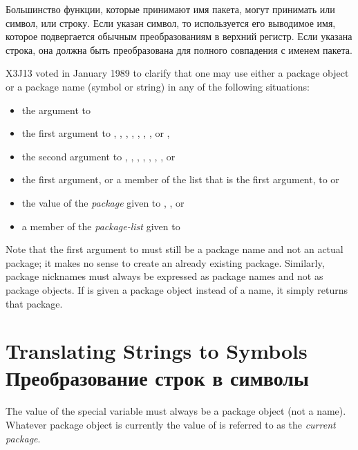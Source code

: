 Большинство функции, которые принимают имя пакета, могут принимать или символ,
или строку. Если указан символ, то используется его выводимое имя, которое
подвергается обычным преобразованиям в верхний регистр. Если указана строка, она
должна быть преобразована для полного совпадения с именем пакета.

\begin{new}
X3J13 voted in January 1989
to clarify that one may use either a package object or
a package name (symbol or string) in any of the following
situations:
\begin{itemize}
\item the  argument to 
\item the first argument to , ,
, ,
, ,
, or ,


\item the second argument to , ,
, , , , ,
or 
\item the first argument, or a member of the list that is the first argument,
to  or 
\item the value of the \emph{package} given to ,
, or 
\item a member of the \emph{package-list} given to 
\end{itemize}
Note that the first argument to  must still be a package
name and not an actual package; it makes no sense to create an already
existing package.  Similarly, package nicknames must always be expressed
as package names and not as package objects.  If  is
given a package object instead of a name, it simply returns that package.
\end{new}

\section{Translating Strings to Symbols Преобразование строк в символы}
\label{STRING-TO-SYMBOL-SECTION}

The value of the special variable  must always be a package
object (not a name).  Whatever package object is currently the
value of  is referred to as the \emph{current package}.

